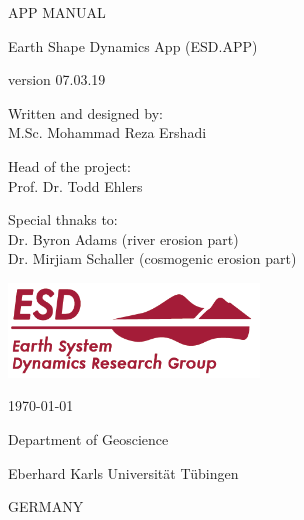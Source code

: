 \documentclass[11pt,a4paper,titlepage]{report}
\begin{document}
\begin{titlepage}
\centering
{\Huge APP MANUAL\par}
\vspace{2cm}

{\Huge Earth Shape Dynamics App (ESD.APP)\par}
\vspace{0.5cm}

{\Large version 07.03.19\par}
\vspace{2cm}
    
{\Large Written and designed by:\\
\huge M.Sc. Mohammad Reza Ershadi\par}
\vspace{2cm}
    
{\LARGE Head of the project:\\
\huge Prof. Dr. Todd Ehlers\par}
\vspace{1cm}

{\LARGE Special thnaks to:\\
\huge Dr. Byron Adams (river erosion part)\\
\huge Dr. Mirjiam Schaller (cosmogenic erosion part)\par}
\vspace{2cm}
        
\centering
\includegraphics[width=0.5\textwidth]{ESD_logo.png}\par
\vspace{1cm}

{\LARGE\monthyeardate\today\par}
\vfill    
    
{\large Department of Geoscience\par}
{\large Eberhard Karls Universität Tübingen\par}  
{\large GERMANY}     
\end{titlepage}
\tableofcontents
\listoffigures
\listoftables
\newpage
\end{document}
